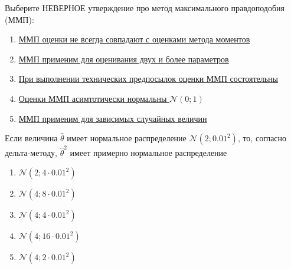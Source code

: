 \documentclass[t]{beamer}
\newcommand{\cN}{\mathcal{N}}
\begin{document}
 \begin{frame} \label{30} 
\begin{block}{30} 

  Выберите НЕВЕРНОЕ утверждение про метод максимального правдоподобия (ММП):
  


 \end{block} 
\begin{enumerate} 
\item[] \hyperlink{30-No}{\beamergotobutton{} ММП оценки не всегда совпадают с оценками метода моментов}
\item[] \hyperlink{30-No}{\beamergotobutton{} ММП применим для оценивания двух и более параметров}
\item[] \hyperlink{30-No}{\beamergotobutton{} При выполнении технических предпосылок оценки ММП состоятельны}
\item[] \hyperlink{30-Yes}{\beamergotobutton{} Оценки ММП асимтотически нормальны $\cN(0;1)$}
\item[] \hyperlink{30-No}{\beamergotobutton{} ММП применим для зависимых случайных величин}
\end{enumerate} 
\end{frame} 


 \begin{frame} \label{31} 
\begin{block}{31} 

  Если величина $\hat\theta$ имеет нормальное распределение $\cN(2;0.01^2)$, то, согласно дельта-методу, $\hat\theta^2$ имеет примерно нормальное распределение
  


 \end{block} 
\begin{enumerate} 
\item[] \hyperlink{31-No}{\beamergotobutton{} $\cN(2;4\cdot 0.01^2)$}
\item[] \hyperlink{31-No}{\beamergotobutton{} $\cN(4;8\cdot 0.01^2)$}
\item[] \hyperlink{31-No}{\beamergotobutton{} $\cN(4;4\cdot 0.01^2)$}
\item[] \hyperlink{31-Yes}{\beamergotobutton{} $\cN(4;16\cdot 0.01^2)$}
\item[] \hyperlink{31-No}{\beamergotobutton{} $\cN(4;2\cdot 0.01^2)$}
\end{enumerate} 
\end{frame} 
\end{document}
